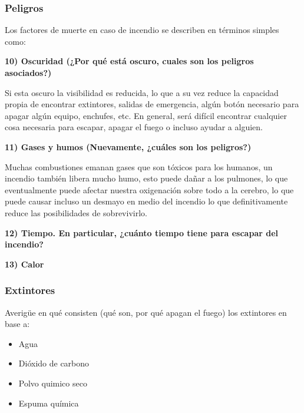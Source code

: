\documentclass[letterpaper,11pt]{article}
\begin{document}


\subsubsection{Peligros}

Los factores de muerte en caso de incendio se describen en términos simples como:

\textbf{10) Oscuridad (¿Por qué está oscuro, cuales son los peligros asociados?)}

	Si esta oscuro la visibilidad es reducida, lo que a su vez reduce la capacidad propia de encontrar extintores, salidas de emergencia, algún botón necesario para apagar algún equipo, enchufes, etc. En general, será difícil encontrar cualquier cosa necesaria para escapar, apagar el fuego o incluso ayudar a alguien.

\textbf{11) Gases y humos (Nuevamente, ¿cuáles son los peligros?)}

Muchas combustiones emanan gases que son tóxicos para los humanos, un incendio también libera mucho humo, esto puede dañar a los pulmones, lo que eventualmente puede afectar nuestra oxigenación sobre todo a la cerebro, lo que puede causar incluso un desmayo en medio del incendio lo que definitivamente reduce las posibilidades de sobrevivirlo.

\textbf{12) Tiempo. En particular, ¿cuánto tiempo tiene para escapar del incendio?}

\textbf{13) Calor}


\subsubsection{Extintores}

Averigüe en qué consisten (qué son, por qué apagan el fuego) los extintores en base a:
\begin{itemize}
    \item Agua
    \item Dióxido de carbono
    \item Polvo quimico seco
    \item Espuma química
\end{itemize}
\end{document}
